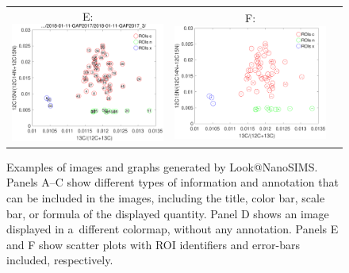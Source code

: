 \documentclass[a4paper, 11pt]{article}
\begin{document}
\begin{figure}[!t]
\begin{tabular}{ccc}
E: \includegraphics[scale=0.3, valign=b]{figs4/a-13C-15N}
&
F: \includegraphics[scale=0.3, valign=b]{figs4/b-13C-15N}
\end{tabular}
\caption{\label{fig:appearance2}%
Examples of images and graphs generated by Look@NanoSIMS. Panels A--C show different types of information and annotation that can be included in the images, including the title, color bar, scale bar, or formula of the displayed quantity. Panel D shows an image displayed in a~different colormap, without any annotation. Panels E and F show scatter plots with ROI identifiers and error-bars included, respectively.}
\end{figure}

\end{document}
